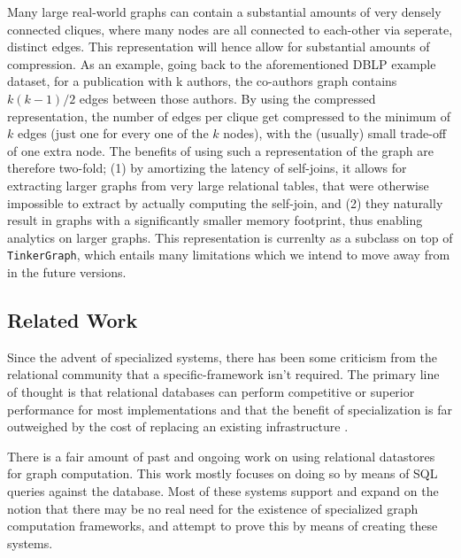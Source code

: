 \documentclass[11pt,letterpaper]{article}
\begin{document}
Many large real-world graphs can contain a substantial amounts of very densely connected cliques, where many nodes are all connected to each-other via seperate, distinct edges. This representation will hence allow for substantial amounts of compression. As an example, going back to the aforementioned DBLP example dataset, for a publication with k authors, the co-authors graph contains $k(k-1)/2$ edges between those authors. By using the compressed representation, the number of edges per clique get compressed to the minimum of $k$ edges (just one for every one of the $k$ nodes), with the (usually) small trade-off of one extra node. The benefits of using such a representation of the graph are therefore two-fold; (1) by amortizing the latency of  self-joins, it allows for extracting larger graphs from very large relational tables, that were otherwise impossible to extract by actually computing the self-join, and (2) they naturally result in graphs with a significantly smaller memory footprint, thus enabling analytics on larger graphs. This representation is currenlty as a subclass on top of \texttt{TinkerGraph}, which entails many limitations which we intend to move away from in the future versions.


\subsection*{Related Work}

Since the advent of specialized systems, there has been some criticism from the relational community that a specific-framework isn't required. The primary line of thought is that relational databases can perform competitive or superior performance for most implementations and that the benefit of specialization is far outweighed by the cost of replacing an existing infrastructure \cite{welc_graph_2013}.

There is a fair amount of past and ongoing work on using relational datastores for graph computation. This work mostly focuses on doing so by means of SQL queries against the database. Most of these systems support and expand on the notion that there may be no real need for the existence of specialized graph computation frameworks, and attempt to prove this by means of creating these systems.
\end{document}
